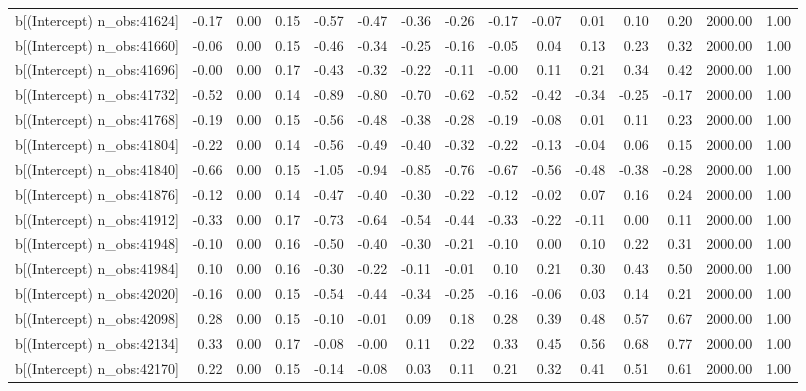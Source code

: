 \begin{table}[ht]
\begin{tabular}{rrrrrrrrrrrrrrr}
  b[(Intercept) n\_obs:41624] & -0.17 & 0.00 & 0.15 & -0.57 & -0.47 & -0.36 & -0.26 & -0.17 & -0.07 & 0.01 & 0.10 & 0.20 & 2000.00 & 1.00 \\ 
  b[(Intercept) n\_obs:41660] & -0.06 & 0.00 & 0.15 & -0.46 & -0.34 & -0.25 & -0.16 & -0.05 & 0.04 & 0.13 & 0.23 & 0.32 & 2000.00 & 1.00 \\ 
  b[(Intercept) n\_obs:41696] & -0.00 & 0.00 & 0.17 & -0.43 & -0.32 & -0.22 & -0.11 & -0.00 & 0.11 & 0.21 & 0.34 & 0.42 & 2000.00 & 1.00 \\ 
  b[(Intercept) n\_obs:41732] & -0.52 & 0.00 & 0.14 & -0.89 & -0.80 & -0.70 & -0.62 & -0.52 & -0.42 & -0.34 & -0.25 & -0.17 & 2000.00 & 1.00 \\ 
  b[(Intercept) n\_obs:41768] & -0.19 & 0.00 & 0.15 & -0.56 & -0.48 & -0.38 & -0.28 & -0.19 & -0.08 & 0.01 & 0.11 & 0.23 & 2000.00 & 1.00 \\ 
  b[(Intercept) n\_obs:41804] & -0.22 & 0.00 & 0.14 & -0.56 & -0.49 & -0.40 & -0.32 & -0.22 & -0.13 & -0.04 & 0.06 & 0.15 & 2000.00 & 1.00 \\ 
  b[(Intercept) n\_obs:41840] & -0.66 & 0.00 & 0.15 & -1.05 & -0.94 & -0.85 & -0.76 & -0.67 & -0.56 & -0.48 & -0.38 & -0.28 & 2000.00 & 1.00 \\ 
  b[(Intercept) n\_obs:41876] & -0.12 & 0.00 & 0.14 & -0.47 & -0.40 & -0.30 & -0.22 & -0.12 & -0.02 & 0.07 & 0.16 & 0.24 & 2000.00 & 1.00 \\ 
  b[(Intercept) n\_obs:41912] & -0.33 & 0.00 & 0.17 & -0.73 & -0.64 & -0.54 & -0.44 & -0.33 & -0.22 & -0.11 & 0.00 & 0.11 & 2000.00 & 1.00 \\ 
  b[(Intercept) n\_obs:41948] & -0.10 & 0.00 & 0.16 & -0.50 & -0.40 & -0.30 & -0.21 & -0.10 & 0.00 & 0.10 & 0.22 & 0.31 & 2000.00 & 1.00 \\ 
  b[(Intercept) n\_obs:41984] & 0.10 & 0.00 & 0.16 & -0.30 & -0.22 & -0.11 & -0.01 & 0.10 & 0.21 & 0.30 & 0.43 & 0.50 & 2000.00 & 1.00 \\ 
  b[(Intercept) n\_obs:42020] & -0.16 & 0.00 & 0.15 & -0.54 & -0.44 & -0.34 & -0.25 & -0.16 & -0.06 & 0.03 & 0.14 & 0.21 & 2000.00 & 1.00 \\ 
  b[(Intercept) n\_obs:42098] & 0.28 & 0.00 & 0.15 & -0.10 & -0.01 & 0.09 & 0.18 & 0.28 & 0.39 & 0.48 & 0.57 & 0.67 & 2000.00 & 1.00 \\ 
  b[(Intercept) n\_obs:42134] & 0.33 & 0.00 & 0.17 & -0.08 & -0.00 & 0.11 & 0.22 & 0.33 & 0.45 & 0.56 & 0.68 & 0.77 & 2000.00 & 1.00 \\ 
  b[(Intercept) n\_obs:42170] & 0.22 & 0.00 & 0.15 & -0.14 & -0.08 & 0.03 & 0.11 & 0.21 & 0.32 & 0.41 & 0.51 & 0.61 & 2000.00 & 1.00 \\ 

\end{tabular}
\end{table}
